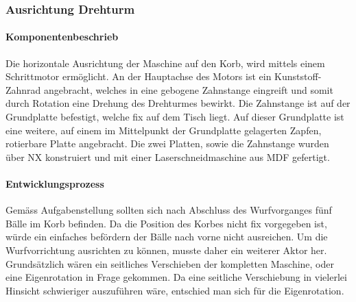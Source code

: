 \subsubsection{Ausrichtung Drehturm}

\paragraph{Komponentenbeschrieb}

Die horizontale Ausrichtung der Maschine auf den Korb, wird mittels einem Schrittmotor ermöglicht. An der Hauptachse des Motors ist ein Kunststoff-Zahnrad angebracht, welches in eine gebogene Zahnstange eingreift und somit durch Rotation eine Drehung des Drehturmes bewirkt. Die Zahnstange ist auf der Grundplatte befestigt, welche fix auf dem Tisch liegt. Auf dieser Grundplatte ist eine weitere, auf einem im Mittelpunkt der Grundplatte gelagerten Zapfen, rotierbare Platte angebracht. Die zwei Platten, sowie die Zahnstange wurden über NX konstruiert und mit einer Laserschneidmaschine aus MDF gefertigt.

\paragraph{Entwicklungsprozess}

Gemäss Aufgabenstellung sollten sich nach Abschluss des Wurfvorganges fünf Bälle im Korb befinden. Da die Position des Korbes nicht fix vorgegeben ist, würde ein einfaches befördern der Bälle nach vorne nicht ausreichen. Um die Wurfvorrichtung ausrichten zu können, musste daher ein weiterer Aktor her. Grundsätzlich wären ein seitliches Verschieben der kompletten Maschine, oder eine Eigenrotation in Frage gekommen. Da eine seitliche Verschiebung in vielerlei Hinsicht schwieriger auszuführen wäre, entschied man sich für die Eigenrotation.